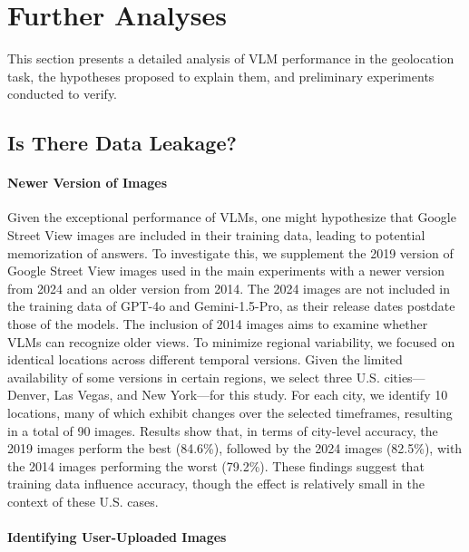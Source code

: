 \section{Further Analyses}

This section presents a detailed analysis of VLM performance in the geolocation task, the hypotheses proposed to explain them, and preliminary experiments conducted to verify.

\subsection{Is There Data Leakage?}

\paragraph{Newer Version of Images}

Given the exceptional performance of VLMs, one might hypothesize that Google Street View images are included in their training data, leading to potential memorization of answers.
To investigate this, we supplement the 2019 version of Google Street View images used in the main experiments with a newer version from 2024 and an older version from 2014.
The 2024 images are not included in the training data of GPT-4o and Gemini-1.5-Pro, as their release dates postdate those of the models.
The inclusion of 2014 images aims to examine whether VLMs can recognize older views.
To minimize regional variability, we focused on identical locations across different temporal versions.
Given the limited availability of some versions in certain regions, we select three U.S. cities—Denver, Las Vegas, and New York—for this study.
For each city, we identify 10 locations, many of which exhibit changes over the selected timeframes, resulting in a total of 90 images.
Results show that, in terms of city-level accuracy, the 2019 images perform the best (84.6\%), followed by the 2024 images (82.5\%), with the 2014 images performing the worst (79.2\%).
These findings suggest that training data influence accuracy, though the effect is relatively small in the context of these U.S. cases.

\paragraph{Identifying User-Uploaded Images}

